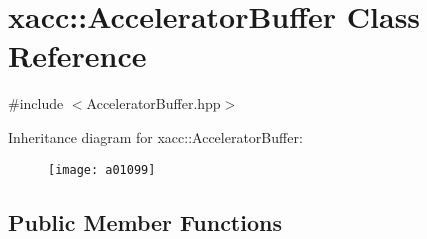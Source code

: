 \hypertarget{a01099}{}\section{xacc\+:\+:Accelerator\+Buffer Class Reference}
\label{a01099}


{\ttfamily \#include $<$Accelerator\+Buffer.\+hpp$>$}

Inheritance diagram for xacc\+:\+:Accelerator\+Buffer\+:\begin{figure}[H]
\begin{center}
\leavevmode
\texttt{[image: a01099]}
\end{center}
\end{figure}
\subsection*{Public Member Functions}

